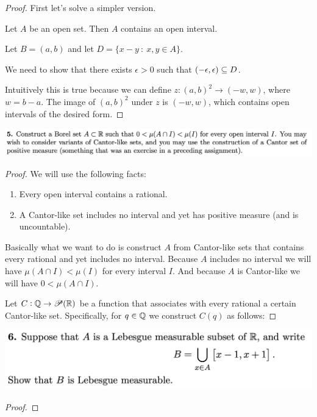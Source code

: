 \begin{proof}
  First let's solve a simpler version.

  Let $A$ be an open set. Then $A$ contains an open interval.

  Let $B = (a, b)$ and let $D = \big\{ x - y ~:~ x, y \in A\big\}$.

  We need to show that there exists $\epsilon > 0$ such that $(-\epsilon, \epsilon) \subseteq D$.

  Intuitively this is true because we can define $z:(a, b)^2 \to (-w, w)$, where $w = b - a$. The image
  of $(a, b)^2$ under $z$ is $(-w, w)$, which contains open intervals of the desired form.
\end{proof}




\newpage
\begin{mdframed}
\includegraphics[width=400pt]{img/analysis--berkeley-202a-hw05-40cd.png}
\end{mdframed}

\begin{proof}
  We will use the following facts:
  \begin{enumerate}
  \item Every open interval contains a rational.
  \item A Cantor-like set includes no interval and yet has positive measure (and is uncountable).
  \end{enumerate}

  Basically what we want to do is construct $A$ from Cantor-like sets that contains every rational and yet
  includes no interval. Because $A$ includes no interval we will have $\mu(A \cap I) < \mu(I)$ for every
  interval $I$. And because $A$ is Cantor-like we will have $0 < \mu(A \cap I)$.

  Let $C: \mathbb{Q} \to \mathscr{P}(\mathbb{R})$ be a function that associates with every rational a certain Cantor-like set.
  Specifically, for $q \in \mathbb{Q}$ we construct $C(q)$ as follows:

\end{proof}

\newpage
\begin{mdframed}
\includegraphics[width=400pt]{img/analysis--berkeley-202a-hw05-3d2c.png}
\end{mdframed}

\begin{proof}

\end{proof}
